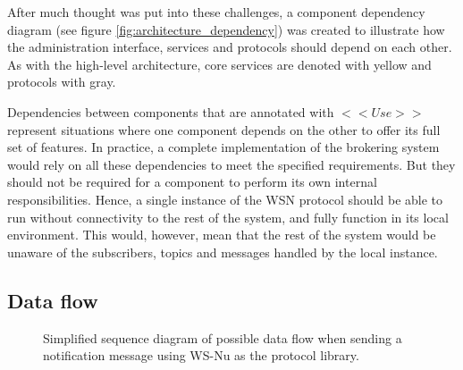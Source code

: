 After much thought was put into these challenges, a component dependency diagram (see figure \ref{fig:architecture_dependency}) was created to illustrate how the administration interface, services and protocols should depend on each other. As with the high-level architecture, core services are denoted with yellow and protocols with gray.

Dependencies between components that are annotated with $<< Use >>$ represent situations where one component depends on the other to offer its full set of features. In practice, a complete implementation of the brokering system would rely on all these dependencies to meet the specified requirements. But they should not be required for a component to perform its own internal responsibilities. Hence, a single instance of the WSN protocol should be able to run without connectivity to the rest of the system, and fully function in its local environment. This would, however, mean that the rest of the system would be unaware of the subscribers, topics and messages handled by the local instance.

\subsection{Data flow}
\label{subsec:architecture_and_implementation-broker_architecture-data_flow}

\begin{center}
  \begin{figure}[ht!]
    \caption{Simplified sequence diagram of possible data flow when sending a notification message using WS-Nu as the protocol library.}
    \label{fig:architecture_data_flow_simple}
  \end{figure}
\end{center}

